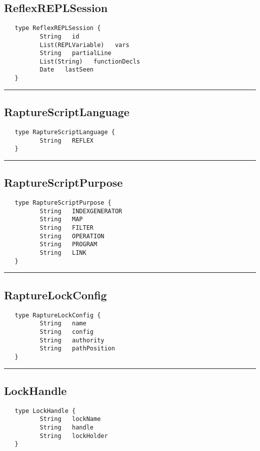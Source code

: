 \subsection{ReflexREPLSession}
\label{type:ReflexREPLSession}

\begin{verbatim}
   type ReflexREPLSession {
          String   id
          List(REPLVariable)   vars
          String   partialLine
          List(String)   functionDecls
          Date   lastSeen
   }
\end{verbatim}

\rule{15cm}{2pt}
\subsection{RaptureScriptLanguage}
\label{type:RaptureScriptLanguage}

\begin{verbatim}
   type RaptureScriptLanguage {
          String   REFLEX
   }
\end{verbatim}

\rule{15cm}{2pt}
\subsection{RaptureScriptPurpose}
\label{type:RaptureScriptPurpose}

\begin{verbatim}
   type RaptureScriptPurpose {
          String   INDEXGENERATOR
          String   MAP
          String   FILTER
          String   OPERATION
          String   PROGRAM
          String   LINK
   }
\end{verbatim}

\rule{15cm}{2pt}
\subsection{RaptureLockConfig}
\label{type:RaptureLockConfig}

\begin{verbatim}
   type RaptureLockConfig {
          String   name
          String   config
          String   authority
          String   pathPosition
   }
\end{verbatim}

\rule{15cm}{2pt}
\subsection{LockHandle}
\label{type:LockHandle}

\begin{verbatim}
   type LockHandle {
          String   lockName
          String   handle
          String   lockHolder
   }
\end{verbatim}

